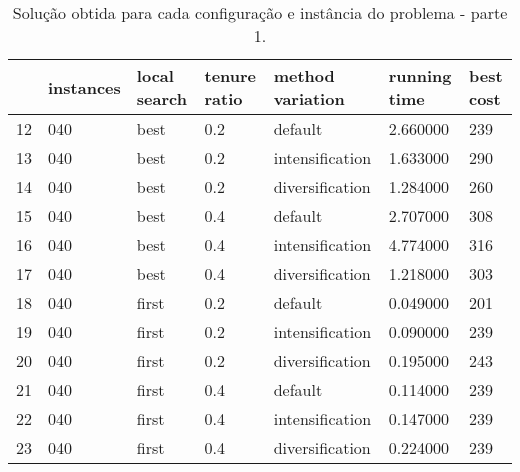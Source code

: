 \begin{landscape}
\begin{table}
\centering
\begin{tabular}{lllllll}
\toprule
{} & instances & local search & tenure ratio & method variation & running time & best cost \\
\midrule
12 &       040 &         best &          0.2 &          default &     2.660000 &       239 \\
13 &       040 &         best &          0.2 &  intensification &     1.633000 &       290 \\
14 &       040 &         best &          0.2 &  diversification &     1.284000 &       260 \\
15 &       040 &         best &          0.4 &          default &     2.707000 &       308 \\
16 &       040 &         best &          0.4 &  intensification &     4.774000 &       316 \\
17 &       040 &         best &          0.4 &  diversification &     1.218000 &       303 \\
18 &       040 &        first &          0.2 &          default &     0.049000 &       201 \\
19 &       040 &        first &          0.2 &  intensification &     0.090000 &       239 \\
20 &       040 &        first &          0.2 &  diversification &     0.195000 &       243 \\
21 &       040 &        first &          0.4 &          default &     0.114000 &       239 \\
22 &       040 &        first &          0.4 &  intensification &     0.147000 &       239 \\
23 &       040 &        first &          0.4 &  diversification &     0.224000 &       239 \\
\bottomrule
\end{tabular}
\caption{Solução obtida para cada configuração e instância do problema - parte 1.}
\label{table:all-data-1}
\end{table}


\end{landscape}
